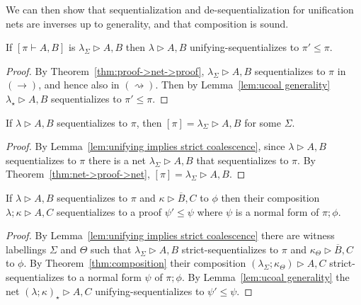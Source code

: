 \documentclass[twoside,a4paper]{article}
\makeatletter
\newcommand\+{+}
\renewcommand\*{\times}
\newcommand\dual[1]{\overline{#1}}
\newcommand\seq[2]{{\vdash}#1,#2}
\newcommand\prf[3]{#1\vdash\!#2,#3}
\newcommand\Seq{\vphantom(\seq}
\newcommand\Prf[3]{\deduce{\Seq{#2}{#3}}{\vphantom(#1}}
\newcommand\net[3]{#1\triangleright #2,#3}
\newcommand\comp{\mathbin;}
\newcommand\scoal{\rightarrow} %
\newcommand\ucoal{\rightsquigarrow}
\newcommand\Qrr{\!\!\scriptstyle\qrr}
\newcommand\qrr[1]{
  \ifx#1+\expandafter\@qrr\else
  \ifx#1*\*\mathrm R\else
  \ifx#1!\forall\mathrm R\else
  \ifx#1?\expandafter\@@qrr\else
  \ifx#11\mathrm{ax}\else
  \ifx#1.\mathrm{cut}\else
  #1\mathrm R
  \fi\fi\fi\fi\fi\fi
}
\newcommand\@qrr[1]{+\mathrm R,#1}
\newcommand\@@qrr[1]{\exists\mathrm R,#1}
\makeatother
\begin{document}
We can then show that sequentialization and de-sequentialization for unification nets are inverses up to generality, and that composition is sound.

\begin{theorem}
If $[\prf\pi AB]$ is $\net{\lambda_\Sigma}AB$ then $\net\lambda AB$ unifying-sequentializes to $\pi'\leq \pi$.
\end{theorem}

\begin{proof}
By Theorem~\ref{thm:proof->net->proof}, $\net{\lambda_\Sigma}AB$ sequentializes to $\pi$ in $(\scoal)$, and hence also in $(\ucoal)$. Then by Lemma~\ref{lem:ucoal generality} $\net{\lambda_\star}AB$ sequentializes to $\pi'\leq\pi$.
\end{proof}


\begin{theorem}
If $\net\lambda AB$ sequentializes to $\pi$, then $[\pi]=\net{\lambda_\Sigma} AB$ for some $\Sigma$.
\end{theorem}

\begin{proof}
By Lemma~\ref{lem:unifying implies strict coalescence}, since $\net\lambda AB$ sequentializes to $\pi$ there is a net $\net{\lambda_\Sigma} AB$ that sequentializes to $\pi$. By Theorem~\ref{thm:net->proof->net}, $[\pi]=\net{\lambda_\Sigma} AB$.
\end{proof}


\begin{theorem}
If $\net\lambda AB$ sequentializes to $\pi$ and $\net\kappa{\dual B}C$ to $\phi$ then their composition $\net{\lambda\comp\kappa}AC$ sequentializes to a proof $\psi'\leq\psi$ where $\psi$ is a normal form of $\pi\comp\phi$.
\end{theorem}

\begin{proof}
By Lemma~\ref{lem:unifying implies strict coalescence} there are witness labellings $\Sigma$ and $\Theta$ such that $\net{\lambda_\Sigma}AB$ strict-sequentializes to $\pi$ and $\net{\kappa_\Theta}{\dual B}C$ to $\phi$. By Theorem~\ref{thm:composition} their composition $(\net{\lambda_\Sigma\comp\kappa_\Theta)}AC$ strict-sequentializes to a normal form $\psi$ of $\pi\comp\phi$. By Lemma~\ref{lem:ucoal generality} the net $\net{(\lambda\comp\kappa)_\star}AC$ unifying-sequentializes to $\psi'\leq\psi$.
\end{proof}
\end{document}
